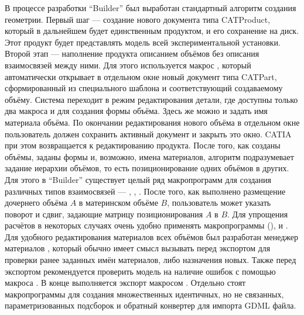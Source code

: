 В процессе разработки ``Builder'' был выработан стандартный алгоритм создания геометрии. Первый шаг --- создание нового документа типа CATProduct, который в дальнейшем будет единственным продуктом, и его сохранение на диск. Этот продукт будет представлять модель всей экспериментальной установки. Второй этап --- наполнение продукта описанием объёмов без описания взаимосвязей между ними. Для этого используется макрос , который автоматически открывает в отдельном окне новый документ типа CATPart, сформированный из специального шаблона и соответствующий создаваемому объёму. Система переходит в режим редактирования детали, где доступны только два макроса  и  для создания формы объёма. Здесь же можно и задать имя материала объёма. По окончании редактирования нового объёма в отдельном окне пользователь должен сохранить активный документ и закрыть это окно. CATIA при этом возвращается к редактированию продукта. После того, как созданы объёмы, заданы формы и, возможно, имена материалов, алгоритм подразумевает задание иерархии объёмов, то есть позиционирование одних объёмов в других. Для этого в ``Builder'' существует целый ряд макропрограмм для создания различных типов взаимосвязей --- , , . После того, как выполнено размещение дочернего объёма $A$ в материнском объёме $B$, пользователь может указать поворот и сдвиг, задающие матрицу позиционирования $A$ в $B$. Для упрощения расчётов в некоторых случаях очень удобно применять макропрограммы  (),  и . Для удобного редактирования материалов всех объёмов был разработан менеджер материалов , который обычно имеет смысл вызывать перед экспортом для проверки ранее заданных имён материалов, либо назначения новых. Также перед экспортом рекомендуется проверить модель на наличие ошибок с помощью макроса . В конце выполняется экспорт макросом . Отдельно стоят макропрограммы  для создания множественных идентичных, но не связанных, параметризованных подсборок и обратный конвертер  для импорта GDML файла.

%                                                                   

